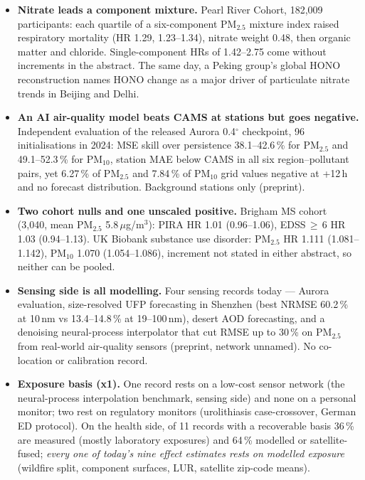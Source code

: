 \documentclass[10pt]{article}
\begin{document}
\footnotesize
\begin{itemize}

\item \textbf{Nitrate leads a component mixture.} Pearl River Cohort, 182,009 participants: each quartile of a six-component PM$_{2.5}$ mixture index raised respiratory mortality (HR 1.29, 1.23--1.34), nitrate weight 0.48, then organic matter and chloride. Single-component HRs of 1.42--2.75 come without increments in the abstract. The same day, a Peking group's global HONO reconstruction names HONO change as a major driver of particulate nitrate trends in Beijing and Delhi.

\item \textbf{An AI air-quality model beats CAMS at stations but goes negative.} Independent evaluation of the released Aurora 0.4$^\circ$ checkpoint, 96 initialisations in 2024: MSE skill over persistence 38.1--42.6\,\% for PM$_{2.5}$ and 49.1--52.3\,\% for PM$_{10}$, station MAE below CAMS in all six region--pollutant pairs, yet 6.27\,\% of PM$_{2.5}$ and 7.84\,\% of PM$_{10}$ grid values negative at +12\,h and no forecast distribution. Background stations only (preprint).

\item \textbf{Two cohort nulls and one unscaled positive.} Brigham MS cohort (3,040, mean PM$_{2.5}$ 5.8\,$\mu$g/m$^3$): PIRA HR 1.01 (0.96--1.06), EDSS\,$\geq$\,6 HR 1.03 (0.94--1.13). UK Biobank substance use disorder: PM$_{2.5}$ HR 1.111 (1.081--1.142), PM$_{10}$ 1.070 (1.054--1.086), increment not stated in either abstract, so neither can be pooled.

\item \textbf{Sensing side is all modelling.} Four sensing records today --- Aurora evaluation, size-resolved UFP forecasting in Shenzhen (best NRMSE 60.2\,\% at 10\,nm vs 13.4--14.8\,\% at 19--100\,nm), desert AOD forecasting, and a denoising neural-process interpolator that cut RMSE up to 30\,\% on PM$_{2.5}$ from real-world air-quality sensors (preprint, network unnamed). No co-location or calibration record.

\item \textbf{Exposure basis (x1).} One record rests on a low-cost sensor network (the neural-process interpolation benchmark, sensing side) and none on a personal monitor; two rest on regulatory monitors (urolithiasis case-crossover, German ED protocol). On the health side, of 11 records with a recoverable basis 36\,\% are measured (mostly laboratory exposures) and 64\,\% modelled or satellite-fused; \emph{every one of today's nine effect estimates rests on modelled exposure} (wildfire split, component surfaces, LUR, satellite zip-code means).

\end{itemize}
\end{document}
